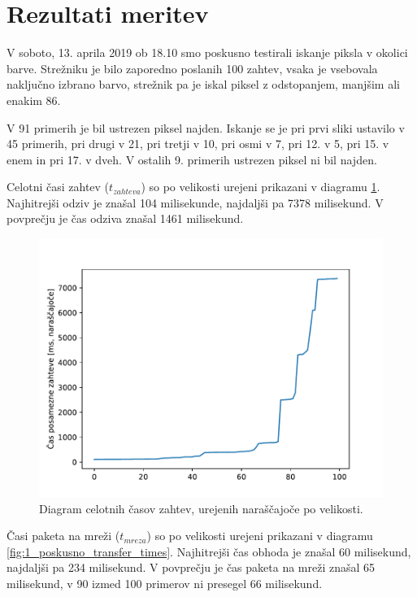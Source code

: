 \section{Rezultati meritev} %

V soboto, 13. aprila 2019 ob 18.10 smo poskusno testirali iskanje piksla v okolici barve.
Strežniku je bilo zaporedno poslanih 100 zahtev, vsaka je vsebovala naključno izbrano barvo, strežnik pa je iskal piksel z odstopanjem, manjšim ali enakim 86.

V 91 primerih je bil ustrezen piksel najden.
Iskanje se je pri prvi sliki ustavilo v 45 primerih, pri drugi v 21, pri tretji v 10, pri osmi v 7, pri 12. v 5, pri 15. v enem in pri 17. v dveh.
V ostalih 9. primerih ustrezen piksel ni bil najden.

Celotni časi zahtev ($t_{zahteva}$) so po velikosti urejeni prikazani v diagramu \ref{fig:1_poskusno_total_times}.
Najhitrejši odziv je znašal 104 milisekunde, najdaljši pa 7378 milisekund.
V povprečju je čas odziva znašal 1461 milisekund.

\begin{figure}[H]
\centering
\includegraphics[scale=0.8]{Img/1_poskusno_total_times.pdf}
\caption{Diagram celotnih časov zahtev, urejenih naraščajoče po velikosti.}
\label{fig:1_poskusno_total_times}
\end{figure}

Časi paketa na mreži ($t_{mreza}$) so po velikosti urejeni prikazani v diagramu \ref{fig:1_poskusno_transfer_times}.
Najhitrejši čas obhoda je znašal 60 milisekund, najdaljši pa 234 milisekund.
V povprečju je čas paketa na mreži znašal 65 milisekund, v 90 izmed 100 primerov ni presegel 66 milisekund.


